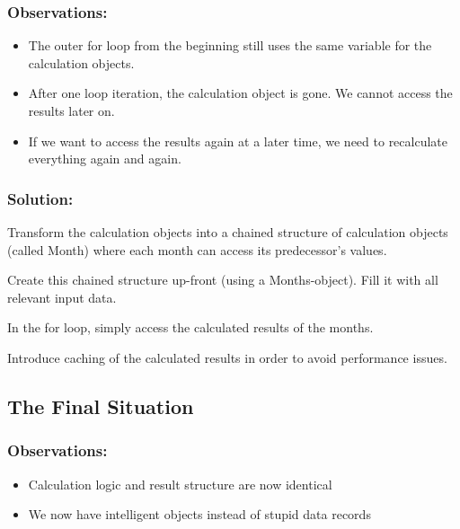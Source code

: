 \documentclass[a4paper,fleqn,titlepage,11pt]{article}
\begin{document}
\subsubsection*{Observations:}

\begin{itemize}
\item The outer for loop from the beginning still uses the same variable for the calculation objects.
\item After one loop iteration, the calculation object is gone. We cannot access the results later on.
\item If we want to access the results again at a later time, we need to recalculate everything again and again.
\end{itemize}

\subsubsection*{Solution:}

Transform the calculation objects into a chained structure of calculation objects (called Month) where each month can access its predecessor's values.

Create this chained structure up-front (using a Months-object). Fill it with all relevant input data.

In the for loop, simply access the calculated results of the months.

Introduce caching of the calculated results in order to avoid performance issues.


\subsection*{The Final Situation}

\subsubsection*{Observations:}

\begin{itemize}
\item Calculation logic and result structure are now identical
\item We now have intelligent objects instead of stupid data records
\end{itemize}
\end{document}
